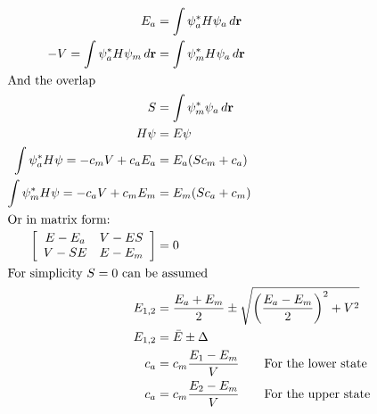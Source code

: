 \begin{columns}
{\begin{align*}
        E_a&=\int\psi_{a}^*H\psi_{a}\,d\mathbf{r}\\
        -V=\int\psi_{a}^*H\psi_{m}\,d\mathbf{r}&=\int\psi_{m}^*H\psi_{a}\,d\mathbf{r}\\
        \intertext{And the overlap}
        S&=\int\psi_{m}^*\psi_{a}\,d\mathbf{r}\\
        H\psi&=E\psi\\
        \int \psi_{a}^*H\psi=-c_mV+c_aE_a&=E_a(Sc_m+c_a)\\
        \int \psi_{m}^*H\psi=-c_aV+c_mE_m&=E_m(Sc_a+c_m)\\
        \intertext{Or in matrix form:}
        \left[\begin{array}{cc}
                E-E_a & V-ES\\
                V-SE & E-E_m
        \end{array}\right] &= 0\\
        \intertext{For simplicity $S=0$ can be assumed}
        E_{1,2}&= \frac{E_a+E_m}{2}\pm \sqrt{\left(\frac{E_a-E_m}{2}\right)^2+V^2}\\
        E_{1,2}&= \bar{E} \pm\Delta\\
        c_a&=c_m \frac{E_1-E_m}{V}\qquad\textup{For the lower state}\\
        c_a&=c_m \frac{E_2-E_m}{V}\qquad\textup{For the upper state}\\
\end{align*}}

        \begin{subcolumns}

%
%


\end{subcolumns}
\end{columns}
